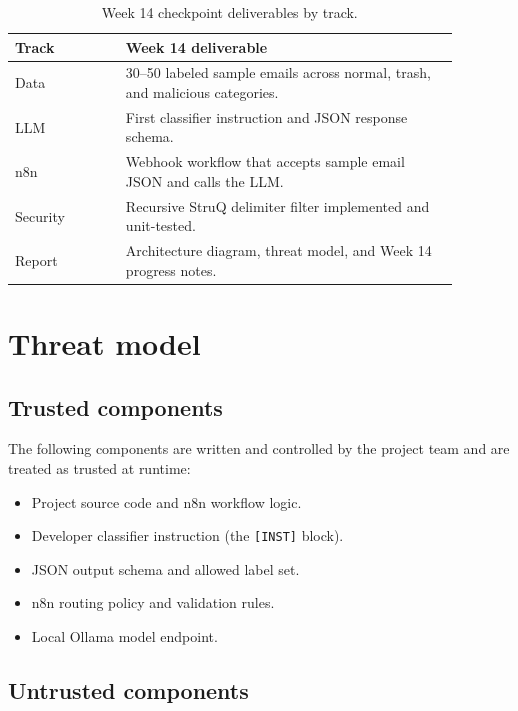 \documentclass[11pt,a4paper]{article}
\begin{document}
\begin{table}[H]
\centering
\begin{tabular}{p{0.22\linewidth} p{0.66\linewidth}}
\toprule
\textbf{Track} & \textbf{Week 14 deliverable} \\
\midrule
Data      & 30--50 labeled sample emails across normal, trash, and malicious categories. \\
LLM       & First classifier instruction and JSON response schema. \\
n8n       & Webhook workflow that accepts sample email JSON and calls the LLM. \\
Security  & Recursive StruQ delimiter filter implemented and unit-tested. \\
Report    & Architecture diagram, threat model, and Week 14 progress notes. \\
\bottomrule
\end{tabular}
\caption{Week 14 checkpoint deliverables by track.}
\end{table}

\section{Threat model}

\subsection{Trusted components}

The following components are written and controlled by the project team and are
treated as trusted at runtime:

\begin{itemize}[leftmargin=2em]
  \item Project source code and n8n workflow logic.
  \item Developer classifier instruction (the \texttt{[INST]} block).
  \item JSON output schema and allowed label set.
  \item n8n routing policy and validation rules.
  \item Local Ollama model endpoint.
\end{itemize}

\subsection{Untrusted components}
\end{document}
